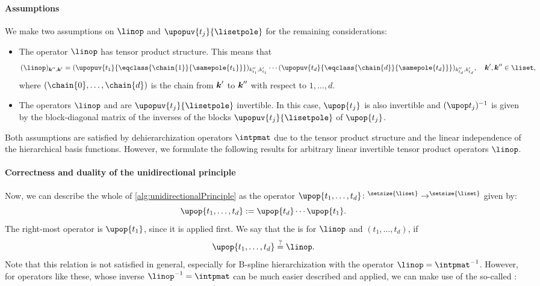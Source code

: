 \paragraph{Assumptions}

We make two assumptions on $\linop$ and $\upopuv{t_j}{\lisetpole}$
for the remaining considerations:
\begin{itemize}
  \item
  The operator $\linop$ has tensor product structure.
  This means that
  \begin{equation}
    \label{eq:tensorProductOperator}
    (\linop)_{\*k'',\*k'}
    =
    (\upopuv{t_1}{\eqclass{\chain{1}}{\samepole{t_1}}})_{k''_{t_1},k'_{t_1}}
    \dotsm
    (\upopuv{t_d}{\eqclass{\chain{d}}{\samepole{t_d}}})_{k''_{t_d},k'_{t_d}},
    \quad
    \*k', \*k'' \in \liset,
  \end{equation}
  where $(\chain{0}, \dotsc, \chain{d})$ is the chain
  from ${\boldsymbol{k}}'$ to ${\boldsymbol{k}}''$ with respect to $1, \dotsc, d$.
  
  \item
  The operators $\linop$ and are $\upopuv{t_j}{\lisetpole}$ invertible.
  In this case, $\upop{t_j}$ is also invertible and
  $\upopinv{t_j}$ is given by the block-diagonal matrix of
  the inverses of the blocks $\upopuv{t_j}{\lisetpole}$ of $\upop{t_j}$.
\end{itemize}
Both assumptions are satisfied by dehierarchization
operators $\intpmat$ due to the tensor product structure and the
linear independence of the hierarchical basis functions.
However, we formulate the following results for arbitrary
linear invertible tensor product operators $\linop$.

\paragraph{Correctness and duality of the unidirectional principle}

Now, we can describe the whole \up of
\cref{alg:unidirectionalPrinciple} as the operator
$\upop{t_1,\dotsc,t_d}\colon \real^{\setsize{\liset}} \to
\real^{\setsize{\liset}}$ given by:
\begin{equation}
  \label{eq:upopProduct}
  \upop{t_1,\dotsc,t_d}
  := \upop{t_d} \dotsm \upop{t_1}.
\end{equation}
The right-most operator is $\upop{t_1}$, since it is applied first.
We say that the \up is  for $\linop$ and
$(t_1, \dotsc, t_d)$, if
\begin{equation}
  \upop{t_1,\dotsc,t_d}
  \overset{?}{=} \linop.
\end{equation}
Note that this relation is not satisfied in general,
especially for B-spline hierarchization with the operator
$\linop = \intpmatinv$.
However, for operators like these, whose inverse
$\linopinv = \intpmat$ can be much easier described and applied,
we can make use of the so-called :

